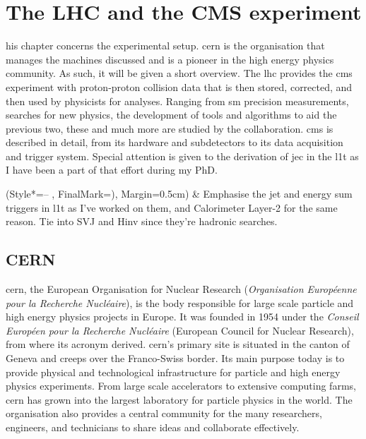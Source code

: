 \let\textcircled=\pgftextcircled
\chapter{The LHC and the CMS experiment}
\label{chap:detector}

his chapter concerns the experimental setup. \acrshort{cern} is the organisation that manages the machines discussed and is a pioneer in the high energy physics community. As such, it will be given a short overview. The \acrlong{lhc} provides the \acrshort{cms} experiment with proton-proton collision data that is then stored, corrected, and then used by physicists for analyses. Ranging from \acrlong{sm} precision measurements, searches for new physics, the development of tools and algorithms to aid the previous two, these and much more are studied by the collaboration. \acrshort{cms} is described in detail, from its hardware and subdetectors to its data acquisition and trigger system. Special attention is given to the derivation of \acrfull{jec} in the \acrfull{l1t} as I have been a part of that effort during my PhD.

\begin{easylist}[itemize]
\ListProperties(Style*=-- , FinalMark={)}, Margin=0.5cm)
& Emphasise the jet and energy sum triggers in \acrlong{l1t} as I've worked on them, and Calorimeter Layer-2 for the same reason. Tie into SVJ and Hinv since they're hadronic searches.
\end{easylist}




\section{CERN}
\label{sec:detector_cern}

\acrshort{cern}, the European Organisation for Nuclear Research (\emph{Organisation Europ\'{e}enne pour la Recherche Nucl\'{e}aire}), is the body responsible for large scale particle and high energy physics projects in Europe. It was founded in 1954 under the \emph{Conseil Europ\'{e}en pour la Recherche Nucl\'{e}aire} (European Council for Nuclear Research), from where its acronym derived. \acrshort{cern}'s primary site is situated in the canton of Geneva and creeps over the Franco-Swiss border. Its main purpose today is to provide physical and technological infrastructure for particle and high energy physics experiments. From large scale accelerators to extensive computing farms, \acrshort{cern} has grown into the largest laboratory for particle physics in the world. The organisation also provides a central community for the many researchers, engineers, and technicians to share ideas and collaborate effectively.

